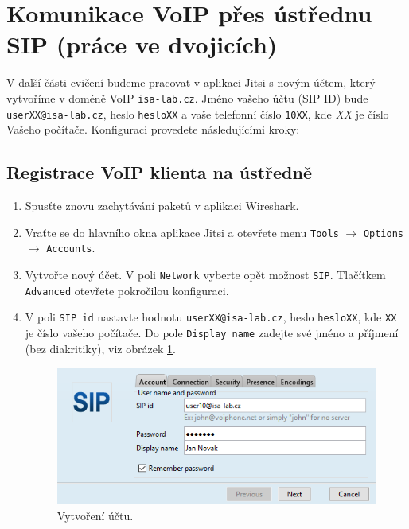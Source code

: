 \documentclass[a4paper,11pt]{article}
\begin{document}
\section{Komunikace VoIP přes ústřednu SIP (práce ve dvojicích)}
V další části cvičení budeme pracovat v aplikaci Jitsi s novým účtem, který vytvoříme v doméně VoIP {\tt isa-lab.cz}. Jméno vašeho účtu (SIP ID) bude {\tt userXX@isa-lab.cz}, heslo {\tt hesloXX} a vaše telefonní číslo {\tt 10XX}, kde {\it XX} je číslo Vašeho počítače. Konfiguraci provedete následujícími kroky: 

\subsection{Registrace VoIP klienta na ústředně}
\begin{enumerate}
    \item Spusťte znovu zachytávání paketů v aplikaci Wireshark.
    \item Vraťte se do hlavního okna aplikace Jitsi a otevřete menu {\tt Tools} $\rightarrow$ {\tt Options} $\rightarrow$ {\tt Accounts}.
    \item Vytvořte nový účet. V poli {\tt Network} vyberte opět možnost {\tt SIP}. Tlačítkem {\tt Advanced} otevřete pokročilou konfiguraci.
    \item V poli {\tt SIP id} nastavte hodnotu {\tt userXX@isa-lab.cz}, heslo {\tt hesloXX}, kde {\tt XX} je číslo vašeho počítače. Do pole {\tt Display name} zadejte své jméno a příjmení (bez diakritiky), viz obrázek \ref{fig:registration1}.
      \begin{figure}[h!]
        \centering
        \includegraphics[scale=0.7]{img/jitsi-registration1c.png}
        \caption{Vytvoření účtu.}
        \label{fig:registration1}
      \end{figure}
      

\end{enumerate}
\end{document}
